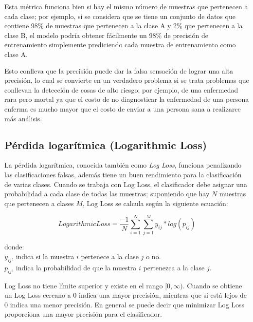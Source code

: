 Esta m\'{e}trica funciona bien si hay el mismo n\'{u}mero de muestras que pertenecen a cada clase; por ejemplo, si se considera que se tiene un conjunto de datos que contiene 98\% de muestras que pertenecen a la clase A y 2\% que pertenecen a la clase B, el modelo podr\'{i}a obtener f\'{a}cilmente un 98\% de precisi\'{o}n de entrenamiento simplemente prediciendo cada muestra de entrenamiento como clase A. 

\vspace{5mm} %

Esto conlleva que la precisi\'{o}n puede dar la falsa sensaci\'{o}n de lograr una alta precisi\'{o}n, lo cual se convierte en un verdadero problema si se trata problemas que conllevan la detecci\'{o}n de cosas de alto riesgo; por ejemplo, de una enfermedad rara pero mortal ya que el costo de no diagnosticar la enfermedad de una persona enferma es mucho mayor que el costo de enviar a una persona sana a realizarce  m\'{a}s an\'{a}lisis.

\subsection{P\'{e}rdida logar\'{i}tmica (Logarithmic Loss)}

La p\'{e}rdida logar\'{i}tmica, conocida tambi\'{e}n como \textit{Log Loss}, funciona penalizando las clasificaciones falsas, adem\'{a}s tiene un buen rendimiento para la clasificaci\'{o}n de varias clases. Cuando se trabaja con Log Loss, el clasificador debe asignar una probabilidad a cada clase de todas las muestras; suponiendo que hay $N$ muestras que pertenecen a clases $M$, Log Loss se calcula seg\'{u}n la siguiente ecuaci\'{o}n:

\begin{equation}
LogarithmicLoss = \frac{-1}{N}\sum_{i=1}^{N}\sum_{j=1}^{M} y_{ij}*log(p_{ij})
\end{equation}

donde:
\\
$y_{ij}$, indica si la muestra $i$ pertenece a la clase $j$ o no.\\
$p_{ij}$, indica la probabilidad de que la muestra $i$ pertenezca a la clase $j$.

\vspace{5mm} %

Log Loss no tiene l\'{i}mite superior y existe en el rango $[0, \infty )$. Cuando se obtiene un Log Loss cercano a 0 indica una mayor precisi\'{o}n, mientras que si est\'{a} lejos de 0 indica una menor precisi\'{o}n. En general se puede decir que minimizar Log Loss proporciona una mayor precisi\'{o}n para el clasificador.

